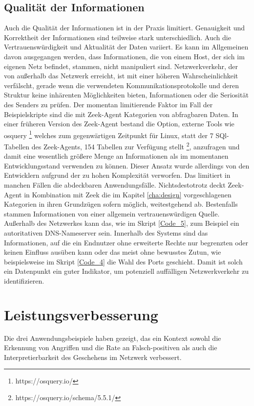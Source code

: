 \subsection{Qualität der Informationen}
Auch die Qualität der Informationen ist in der Praxis limitiert. Genauigkeit und Korrektheit der Informationen sind teilweise stark unterschiedlich. Auch die Vertrauenswürdigkeit und Aktualität der Daten variiert. Es kann im Allgemeinen davon ausgegangen werden, dass Informationen, die von einem Host, der sich im eigenen Netz befindet, stammen, nicht manipuliert sind. Netzwerkverkehr, der von außerhalb das Netzwerk erreicht, ist mit einer höheren Wahrscheinlichkeit verfälscht, gerade wenn die verwendeten Kommunikationsprotokolle und deren Struktur keine inhärenten Möglichkeiten bieten, Informationen oder die Seriosität des Senders zu prüfen.
Der momentan limitierende Faktor im Fall der Beispielskripte sind die mit Zeek-Agent Kategorien von abfragbaren Daten. In einer früheren Version des Zeek-Agent bestand die Option, externe Tools wie osquery \footnote{https://osquery.io/} welches zum gegenwärtigen Zeitpunkt für Linux, statt der 7 SQl-Tabellen des Zeek-Agents, 154 Tabellen zur Verfügung stellt \footnote{https://osquery.io/schema/5.5.1/}, anzufragen und damit eine wesentlich größere Menge an Informationen als im momentanen Entwicklungsstand verwenden zu können. Dieser Ansatz wurde allerdings von den Entwicklern aufgrund der zu hohen Komplexität verworfen. Das limitiert in manchen Fällen die abdeckbaren Anwendungsfälle. Nichtsdestotrotz deckt Zeek-Agent in Kombination mit Zeek die im Kapitel \ref{cha:design} vorgeschlagenen Kategorien in ihren Grundzügen sofern möglich, weitestgehend ab.
Bestenfalls stammen Informationen von einer allgemein vertrauenswürdigen Quelle. Außerhalb des Netzwerkes kann das, wie im Skript \ref{Code_5}, zum Beispiel ein autoritativen DNS-Nameserver sein. Innerhalb des Systems sind das Informationen, auf die ein Endnutzer ohne erweiterte Rechte nur begrenzten oder keinen Einfluss ausüben kann oder das meist ohne bewusstes Zutun, wie beispielsweise im Skript \ref{Code_4} die Wahl des Ports geschieht. Damit ist solch ein Datenpunkt ein guter Indikator, um potenziell auffälligen Netzwerkverkehr zu identifizieren.
\section{Leistungsverbesserung}
Die drei Anwendungsbeispiele haben gezeigt, das ein Kontext sowohl die Erkennung von Angriffen und die Rate an Falsch-positiven als auch die Interpretierbarkeit des Geschehens im Netzwerk verbessert.
